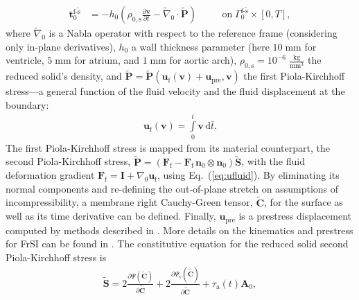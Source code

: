 \begin{align}
    \boldsymbol{t}_{0}^{\mathrm{f}\text{-}\tilde{\mathrm{s}}} &= -h_0\left(\rho_{0,\mathrm{s}} \frac{\partial \boldsymbol{v}}{\partial t} - \tilde{\nabla}_{0}\cdot\tilde{\boldsymbol{P}}\right) \quad &&\text{on} \; \mathit{\Gamma}_{0}^{\mathrm{f}\text{-}\tilde{\mathrm{s}}} \times [0,T], \label{eq:frsi_tsolid_gen}
\end{align}
where $\tilde{\nabla}_{0}$ is a Nabla operator with respect to the reference frame (considering only in-plane derivatives), $h_0$ a wall thickness parameter (here $10\;\mathrm{mm}$ for ventricle, $5\;\mathrm{mm}$ for atrium, and $1\;\mathrm{mm}$ for aortic arch), $\rho_{0,\mathrm{s}}=10^{-6}\;\frac{\mathrm{kg}}{\mathrm{mm}^{3}}$ the reduced solid's density, and $\tilde{\boldsymbol{P}}=\tilde{\boldsymbol{P}}(\boldsymbol{u}_{\mathrm{f}}(\boldsymbol{v}) + \boldsymbol{u}_{\mathrm{pre}}, \boldsymbol{v})$ the first Piola-Kirchhoff stress---a general function of the fluid velocity and the fluid displacement at the boundary:
\begin{align}
    \boldsymbol{u}_{\mathrm{f}}(\boldsymbol{v}) = \int\limits_{0}^{t}\boldsymbol{v}\,\mathrm{d}\bar{t}
    \label{eq:ufluid}.
\end{align}
The first Piola-Kirchhoff stress is mapped from its material counterpart, the second Piola-Kirchhoff stress, $\tilde{\boldsymbol{P}} = (\boldsymbol{F}_{\mathrm{f}} - \boldsymbol{F}_{\mathrm{f}}\,\boldsymbol{n}_{0}\otimes\boldsymbol{n}_{0}) \tilde{\boldsymbol{S}}$, with the fluid deformation gradient $\boldsymbol{F}_{\mathrm{f}} = \boldsymbol{I} + \nabla_{0}\boldsymbol{u}_{\mathrm{f}}$, using Eq.~(\ref{eq:ufluid}). By eliminating its normal components and re-defining the out-of-plane stretch on assumptions of incompressibility, a membrane right Cauchy-Green tensor, $\tilde{\boldsymbol{C}}$, for the surface as well as its time derivative can be defined. Finally, $\boldsymbol{u}_{\mathrm{pre}}$ is a prestress displacement computed by methods described in \cite{schein2021,gee2010}. More details on the kinematics and prestress for FrSI can be found in \cite{hirschvogel2024-frsi}. The constitutive equation for the reduced solid second Piola-Kirchhoff stress is
\begin{align}
\tilde{\boldsymbol{S}} = 2\frac{\partial\mathit{\Psi}(\tilde{\boldsymbol{C}})}{\partial \tilde{\boldsymbol{C}}} + 2\frac{\partial\mathit{\Psi}_{\mathrm{v}}(\dot{\tilde{\boldsymbol{C}}})}{\partial \dot{\tilde{\boldsymbol{C}}}} + \tau_{\mathrm{a}}(t) \boldsymbol{A}_{0}, \label{eq:S_red}
\end{align}
